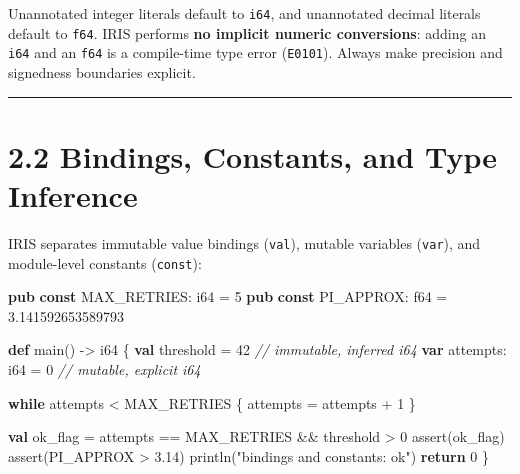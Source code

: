 \documentclass[
  english,
  oneside]{book}
\newenvironment{Shaded}{\begin{snugshade}}{\end{snugshade}}
\newcommand{\CommentTok}[1]{\textcolor[rgb]{0.42,0.60,0.33}{\textit{#1}}}
\newcommand{\ControlFlowTok}[1]{\textcolor[rgb]{0.77,0.53,0.75}{\textbf{#1}}}
\newcommand{\DataTypeTok}[1]{\textcolor[rgb]{0.31,0.79,0.69}{#1}}
\newcommand{\DecValTok}[1]{\textcolor[rgb]{0.71,0.81,0.66}{#1}}
\newcommand{\FloatTok}[1]{\textcolor[rgb]{0.71,0.81,0.66}{#1}}
\newcommand{\FunctionTok}[1]{\textcolor[rgb]{0.86,0.86,0.67}{#1}}
\newcommand{\KeywordTok}[1]{\textcolor[rgb]{0.34,0.61,0.84}{\textbf{#1}}}
\newcommand{\NormalTok}[1]{\textcolor[rgb]{0.83,0.83,0.83}{#1}}
\newcommand{\OperatorTok}[1]{\textcolor[rgb]{0.83,0.83,0.83}{#1}}
\newcommand{\StringTok}[1]{\textcolor[rgb]{0.81,0.57,0.47}{#1}}
\begin{document}
Unannotated integer literals default to \texttt{i64}, and unannotated
decimal literals default to \texttt{f64}. IRIS performs \textbf{no
implicit numeric conversions}: adding an \texttt{i64} and an
\texttt{f64} is a compile-time type error (\texttt{E0101}). Always make
precision and signedness boundaries explicit.

\begin{center}\rule{0.5\linewidth}{0.5pt}\end{center}

\section{2.2 Bindings, Constants, and Type
Inference}\label{bindings-constants-and-type-inference}

IRIS separates immutable value bindings (\texttt{val}), mutable
variables (\texttt{var}), and module-level constants (\texttt{const}):

\begin{Shaded}
\begin{Highlighting}[]
\KeywordTok{pub} \KeywordTok{const}\NormalTok{ MAX\_RETRIES: }\DataTypeTok{i64} \OperatorTok{=} \DecValTok{5}
\KeywordTok{pub} \KeywordTok{const}\NormalTok{ PI\_APPROX: }\DataTypeTok{f64} \OperatorTok{=} \FloatTok{3.141592653589793}

\KeywordTok{def}\NormalTok{ main() }\OperatorTok{{-}\textgreater{}} \DataTypeTok{i64}\NormalTok{ \{}
    \KeywordTok{val}\NormalTok{ threshold }\OperatorTok{=} \DecValTok{42}          \CommentTok{// immutable, inferred i64}
    \KeywordTok{var}\NormalTok{ attempts: }\DataTypeTok{i64} \OperatorTok{=} \DecValTok{0}       \CommentTok{// mutable, explicit i64}

    \ControlFlowTok{while}\NormalTok{ attempts }\OperatorTok{\textless{}}\NormalTok{ MAX\_RETRIES \{}
\NormalTok{        attempts }\OperatorTok{=}\NormalTok{ attempts }\OperatorTok{+} \DecValTok{1}
\NormalTok{    \}}

    \KeywordTok{val}\NormalTok{ ok\_flag }\OperatorTok{=}\NormalTok{ attempts }\OperatorTok{==}\NormalTok{ MAX\_RETRIES }\OperatorTok{\&\&}\NormalTok{ threshold }\OperatorTok{\textgreater{}} \DecValTok{0}
    \FunctionTok{assert}\NormalTok{(ok\_flag)}
    \FunctionTok{assert}\NormalTok{(PI\_APPROX }\OperatorTok{\textgreater{}} \FloatTok{3.14}\NormalTok{)}
\NormalTok{    println(}\StringTok{"bindings and constants: ok"}\NormalTok{)}
    \ControlFlowTok{return} \DecValTok{0}
\NormalTok{\}}
\end{Highlighting}
\end{Shaded}
\end{document}
